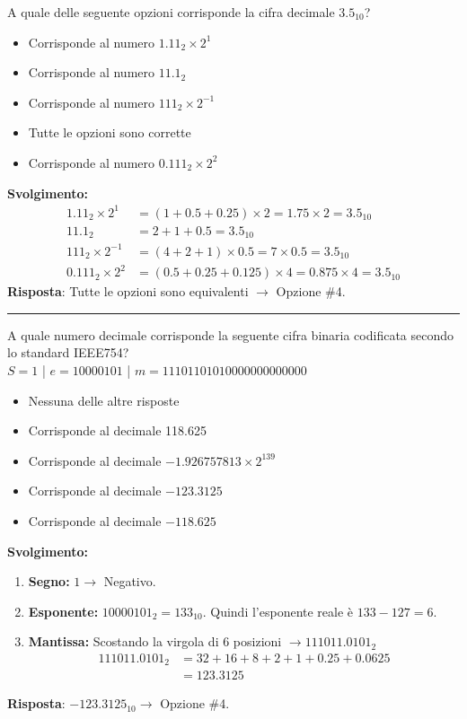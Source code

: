\documentclass[12pt, a4paper]{article}
\begin{document}
A quale delle seguente opzioni corrisponde la cifra decimale $3.5_{10}$?
\begin{itemize}
    \item[$\square$] Corrisponde al numero $1.11_2 \times 2^{1}$
    \item[$\square$] Corrisponde al numero $11.1_2$
    \item[$\square$] Corrisponde al numero $111_2 \times 2^{-1}$
    \item[$\blacksquare$] Tutte le opzioni sono corrette
    \item[$\square$] Corrisponde al numero $0.111_2 \times 2^{2}$
\end{itemize}

\textbf{Svolgimento:}
\begin{align*}
1.11_2 \times 2^{1} &= (1 + 0.5 + 0.25) \times 2 = 1.75 \times 2 = 3.5_{10} \\
11.1_2 &= 2 + 1 + 0.5 = 3.5_{10} \\
111_2 \times 2^{-1} &= (4 + 2 + 1) \times 0.5 = 7 \times 0.5 = 3.5_{10} \\
0.111_2 \times 2^{2} &= (0.5 + 0.25 + 0.125) \times 4 = 0.875 \times 4 = 3.5_{10}
\end{align*}
\textbf{Risposta}: Tutte le opzioni sono equivalenti $\rightarrow$ Opzione \#4.

\vspace{0.5cm}
\hrule
\vspace{0.5cm}

A quale numero decimale corrisponde la seguente cifra binaria codificata secondo lo standard IEEE754?\\
$S=1$ | $e=10000101$ | $m=11101101010000000000000$
\begin{itemize}
    \item[$\square$] Nessuna delle altre risposte
    \item[$\square$] Corrisponde al decimale 118.625
    \item[$\square$] Corrisponde al decimale $-1.926757813 \times 2^{139}$
    \item[$\blacksquare$] Corrisponde al decimale $-123.3125$
    \item[$\square$] Corrisponde al decimale $-118.625$
\end{itemize}

\textbf{Svolgimento:}
\begin{enumerate}
    \item \textbf{Segno:} $1 \rightarrow$ Negativo.
    \item \textbf{Esponente:} $10000101_2 = 133_{10}$. Quindi l'esponente reale è $133 - 127 = 6$.
    \item \textbf{Mantissa:} Scostando la virgola di 6 posizioni $\rightarrow 111011.0101_2$
    \begin{align*}
    111011.0101_2 &= 32 + 16 + 8 + 2 + 1 + 0.25 + 0.0625 \\
    &= 123.3125
    \end{align*}
\end{enumerate}
\textbf{Risposta}: $-123.3125_{10} \rightarrow$ Opzione \#4.
\end{document}

